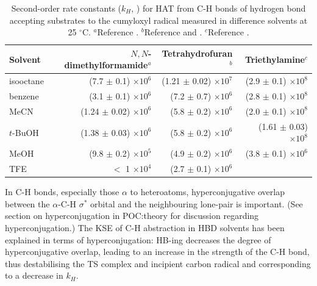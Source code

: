 \begin{table}[htb]
{\footnotesize
\centering
  \begin{tabular}{l r r r}
    Solvent & $N,N$-dimethylformamide$^a$ & Tetrahydrofuran$^b$ & Triethylamine$^c$ \\
    \hline
    \hline
    isooctane & (7.7 $\pm$ 0.1) $\times 10^6$ & (1.21 $\pm$ 0.02) $\times 10^7$ & \rule{0pt}{3ex} (2.9 $\pm$ 0.1) $\times 10^8$  \\
    benzene & (3.1 $\pm$ 0.1) $\times 10^6$ & (7.2 $\pm$ 0.7) $\times 10^6$ & (2.8 $\pm$ 0.1) $\times 10^8$ \\
    MeCN & (1.24 $\pm$ 0.02) $\times 10^6$ & (5.8 $\pm$ 0.2) $\times 10^6$ & (2.0 $\pm$ 0.1) $\times 10^8$ \\
    $t$-BuOH & (1.38 $\pm$ 0.03) $\times 10^6$ & (5.8 $\pm$ 0.2) $\times 10^6$ & (1.61 $\pm$ 0.03) $\times 10^8$ \\
    MeOH & (9.8 $\pm$ 0.2) $\times 10^5$ & (4.9 $\pm$ 0.2) $\times 10^6$ & (3.8 $\pm$ 0.1) $\times 10^6$ \\
    TFE & $<$ 1 $\times 10^4$ & (2.7 $\pm$ 0.1) $\times 10^6$ & \\
  \end{tabular}
  \caption[Summary of second-order rate constants for HAT from C-H bonds for
  hydrogen bond accepting substrates from the cumyloxyl radical.]{Second-order
    rate constants ($k_H$, \Ms) for HAT from C-H bonds of hydrogen bond
    accepting substrates to the cumyloxyl radical measured in difference
    solvents at 25 $^{\circ}$C. $^a$Reference
    . $^b$Reference  and
    . $^c$Reference .}
  \label{tab:kse}
}
\end{table}

\noindent In C-H bonds, especially those $\alpha$ to heteroatoms,
hyperconjugative overlap between the $\alpha$-C-H $\sigma^*$ orbital and the
neighbouring lone-pair is important. (See section on hyperconjugation in
POC:theory for discussion
regarding hyperconjugation.) The KSE of C-H abstraction in HBD solvents has been
explained in terms of hyperconjugation: HB-ing decreases the degree of
hyperconjugative overlap, leading to an increase in the strength of the C-H
bond, thus destabilising the TS complex and incipient carbon radical and
corresponding to a decrease in $k_H$.\cite{Salamone2014Syn,Salamone2015Rev}

